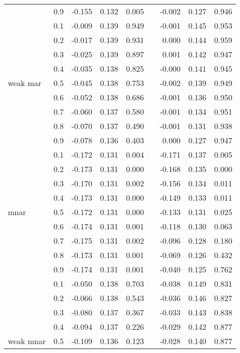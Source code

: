 \documentclass[11pt,a4paper]{article}
\begin{document}
\begin{table}[h!]
\begin{tabular}{lrrrrrrrr}
   & 0.9 & -0.155 & 0.132 & 0.005 &  & -0.002 & 0.127 & 0.946 \\ 
   \cline{2-9}
   & 0.1 & -0.009 & 0.139 & 0.949 &  & -0.001 & 0.145 & 0.953 \\ 
   & 0.2 & -0.017 & 0.139 & 0.931 &  & 0.000 & 0.144 & 0.959 \\ 
   & 0.3 & -0.025 & 0.139 & 0.897 &  & 0.001 & 0.142 & 0.947 \\ 
   & 0.4 & -0.035 & 0.138 & 0.825 &  & -0.000 & 0.141 & 0.945 \\ 
  weak mar & 0.5 & -0.045 & 0.138 & 0.753 &  & -0.002 & 0.139 & 0.949 \\ 
   & 0.6 & -0.052 & 0.138 & 0.686 &  & -0.001 & 0.136 & 0.950 \\ 
   & 0.7 & -0.060 & 0.137 & 0.580 &  & -0.001 & 0.134 & 0.951 \\ 
   & 0.8 & -0.070 & 0.137 & 0.490 &  & -0.001 & 0.131 & 0.938 \\ 
   & 0.9 & -0.078 & 0.136 & 0.403 &  & 0.000 & 0.127 & 0.947 \\ 
   \cline{2-9}
   & 0.1 & -0.172 & 0.131 & 0.004 &  & -0.171 & 0.137 & 0.005 \\ 
   & 0.2 & -0.173 & 0.131 & 0.000 &  & -0.168 & 0.135 & 0.000 \\ 
   & 0.3 & -0.170 & 0.131 & 0.002 &  & -0.156 & 0.134 & 0.011 \\ 
   & 0.4 & -0.173 & 0.131 & 0.000 &  & -0.149 & 0.133 & 0.011 \\ 
  mnar & 0.5 & -0.172 & 0.131 & 0.000 &  & -0.133 & 0.131 & 0.025 \\ 
   & 0.6 & -0.174 & 0.131 & 0.001 &  & -0.118 & 0.130 & 0.063 \\ 
   & 0.7 & -0.175 & 0.131 & 0.002 &  & -0.096 & 0.128 & 0.180 \\ 
   & 0.8 & -0.173 & 0.131 & 0.001 &  & -0.069 & 0.126 & 0.432 \\ 
   & 0.9 & -0.174 & 0.131 & 0.001 &  & -0.040 & 0.125 & 0.762 \\ 
   \cline{2-9}
   & 0.1 & -0.050 & 0.138 & 0.703 &  & -0.038 & 0.149 & 0.831 \\ 
   & 0.2 & -0.066 & 0.138 & 0.543 &  & -0.036 & 0.146 & 0.827 \\ 
   & 0.3 & -0.080 & 0.137 & 0.367 &  & -0.033 & 0.143 & 0.838 \\ 
   & 0.4 & -0.094 & 0.137 & 0.226 &  & -0.029 & 0.142 & 0.877 \\ 
  weak mnar & 0.5 & -0.109 & 0.136 & 0.123 &  & -0.028 & 0.140 & 0.877 \\ 

\end{tabular}
\end{table}
\end{document}
